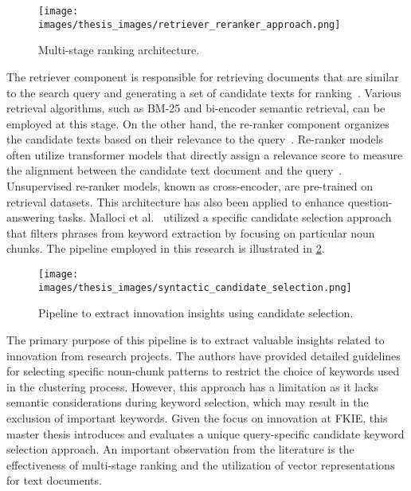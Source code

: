 \begin{figure}[h]
	\centering
	\texttt{[image: images/thesis\_images/retriever\_reranker\_approach.png]}
	\caption{Multi-stage ranking architecture.  \label{fig:multi-stage-ranking}}
\end{figure}

The retriever component is responsible for retrieving documents that are similar to the search query and generating a set of candidate texts for ranking~\cite{yates2021pretrained}. Various retrieval algorithms, such as BM-25 and bi-encoder semantic retrieval, can be employed at this stage. On the other hand, the re-ranker component organizes the candidate texts based on their relevance to the query~\cite{yates2021pretrained}. Re-ranker models often utilize transformer models that directly assign a relevance score to measure the alignment between the candidate text document and the query~\cite{nogueira2019passage, yates2021pretrained}. Unsupervised re-ranker models, known as cross-encoder, are pre-trained on retrieval datasets. This architecture has also been applied to enhance question-answering tasks. Malloci et al.~\cite{malloci2020text} utilized a specific candidate selection approach that filters phrases from keyword extraction by focusing on particular noun chunks. The pipeline employed in this research is illustrated in  \ref{fig:syntactic_candiate_selection}. 

\begin{figure}[h]
	\centering
	\texttt{[image: images/thesis\_images/syntactic\_candidate\_selection.png]}
	\caption[Innovation insights pipeline extraction.]{Pipeline to extract innovation insights using candidate selection.   \label{fig:syntactic_candiate_selection}}
\end{figure}

The primary purpose of this pipeline is to extract valuable insights related to innovation from research projects. The authors have provided detailed guidelines for selecting specific noun-chunk patterns to restrict the choice of keywords used in the clustering process. However, this approach has a limitation as it lacks semantic considerations during keyword selection, which may result in the exclusion of important keywords. Given the focus on innovation at \ac{FKIE}, this master thesis introduces and evaluates a unique query-specific candidate keyword selection approach. An important observation from the literature is the effectiveness of multi-stage ranking and the utilization of vector representations for text documents.

